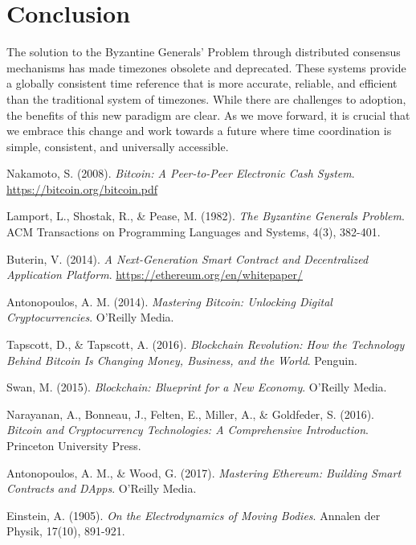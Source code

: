 \documentclass[12pt]{report}
\begin{document}
\chapter{Conclusion}
The solution to the Byzantine Generals' Problem through distributed consensus mechanisms has made timezones obsolete and deprecated. These systems provide a globally consistent time reference that is more accurate, reliable, and efficient than the traditional system of timezones. While there are challenges to adoption, the benefits of this new paradigm are clear. As we move forward, it is crucial that we embrace this change and work towards a future where time coordination is simple, consistent, and universally accessible.

\begin{thebibliography}{9}

Nakamoto, S. (2008). \textit{Bitcoin: A Peer-to-Peer Electronic Cash System}. \url{https://bitcoin.org/bitcoin.pdf}

Lamport, L., Shostak, R., \& Pease, M. (1982). \textit{The Byzantine Generals Problem}. ACM Transactions on Programming Languages and Systems, 4(3), 382-401.

Buterin, V. (2014). \textit{A Next-Generation Smart Contract and Decentralized Application Platform}. \url{https://ethereum.org/en/whitepaper/}

Antonopoulos, A. M. (2014). \textit{Mastering Bitcoin: Unlocking Digital Cryptocurrencies}. O'Reilly Media.

Tapscott, D., \& Tapscott, A. (2016). \textit{Blockchain Revolution: How the Technology Behind Bitcoin Is Changing Money, Business, and the World}. Penguin.

Swan, M. (2015). \textit{Blockchain: Blueprint for a New Economy}. O'Reilly Media.

Narayanan, A., Bonneau, J., Felten, E., Miller, A., \& Goldfeder, S. (2016). \textit{Bitcoin and Cryptocurrency Technologies: A Comprehensive Introduction}. Princeton University Press.

Antonopoulos, A. M., \& Wood, G. (2017). \textit{Mastering Ethereum: Building Smart Contracts and DApps}. O'Reilly Media.

Einstein, A. (1905). \textit{On the Electrodynamics of Moving Bodies}. Annalen der Physik, 17(10), 891-921.

\end{thebibliography}
\end{document}
